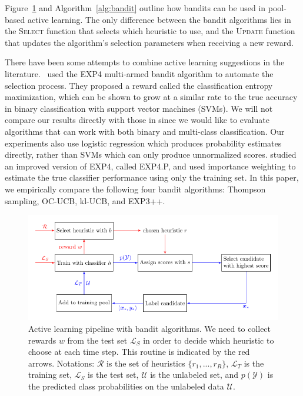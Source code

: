 \documentclass[fleqn,10pt,lineno]{wlpeerj} %
\newcommand{\Y}{\mathcal{Y}}
\newcommand{\Unlabeled}{\mathcal{U}}
\newcommand{\Labeled}{\mathcal{L}}
\newcommand{\R}{\mathcal{R}}
\begin{document}
Figure~\ref{fig:pipeline-bandit} and Algorithm~\ref{alg:bandit} outline how
bandits can be used in pool-based active learning. The only difference between
the bandit algorithms lies in the
\textsc{Select} function that selects which heuristic to use, and the
\textsc{Update} function that updates the algorithm's selection parameters when
receiving a new reward.

There have been some attempts to combine active learning suggestions in the
literature.~\cite{baram04} used the EXP4 multi-armed bandit algorithm to
automate the selection process. They proposed a reward called the
classification entropy maximization, which can be shown to grow at a similar
rate to the true accuracy in binary classification with support vector machines
(SVMs). We will not compare our results directly with those in \cite{baram04}
since we would like to evaluate algorithms that can work with both binary and
multi-class classification. Our experiments also use logistic regression which
produces probability estimates directly, rather than SVMs which can only
produce unnormalized scores. \cite{hsu15} studied an improved version of EXP4,
called EXP4.P, and used importance weighting to estimate the true classifier
performance using only the training set. In this paper, we empirically compare
the following four bandit algorithms: Thompson sampling, OC-UCB, kl-UCB, and
EXP3++.

\begin{figure}[p]
	\centering
	\includegraphics{Fig1}
	\caption{Active learning pipeline with bandit algorithms. We
	need to collect rewards $w$ from the test set $\Labeled_S$ in order to
	decide which heuristic to choose at each time step. This routine is
	indicated by the red arrows. Notations: $\R$ is the set of heuristics
	$\{r_1, ..., r_R\}$, $\Labeled_T$ is the training set, $\Labeled_S$
	is the test set, $\Unlabeled$ is the unlabeled set, and $p(\Y)$ is the
	predicted class probabilities on the unlabeled data $\Unlabeled$.}
	\label{fig:pipeline-bandit}
\end{figure}
\end{document}
